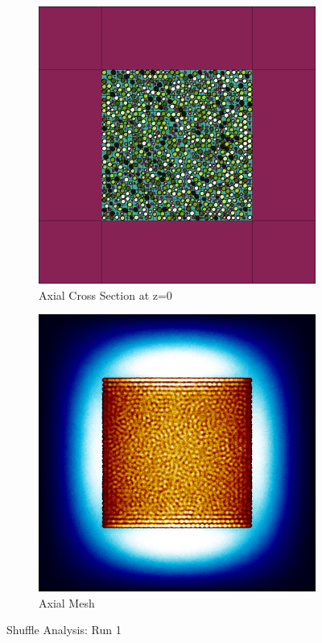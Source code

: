 \begin{figure}[H]
\begin{subfigure}{0.45\textwidth}
  \includegraphics[width=0.95\linewidth]{figures/1234560/1234560-v}
  \caption{Axial Cross Section at z=0 }
  \label{fig:1234560-v}
\end{subfigure}
%
\begin{subfigure}{0.45\textwidth}
  \includegraphics[width=0.95\linewidth]{figures/1234560/1234560-vm}
  \caption{Axial Mesh}
  \label{fig:1234560-vm}
\end{subfigure}
%
\caption{Shuffle Analysis: Run 1}
\label{fig:0-60}
\end{figure}